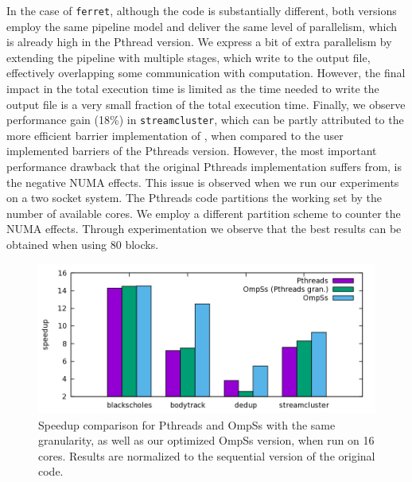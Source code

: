 In the case of \texttt{ferret}, although the code is substantially different, both versions employ the same pipeline model and deliver the same level of parallelism, which is already  high in the Pthread version.  
We express 
a bit of extra parallelism by extending the pipeline with multiple stages, which write to the output file, effectively overlapping some communication with computation. 
However, the final impact in the 
total execution time is limited as the time needed to write the output file is a very small fraction of the total execution time. 
Finally, we observe performance gain (18\%) in \texttt{streamcluster}, which can be partly attributed to the more efficient 
barrier implementation of \OMPSS{}, when compared to the user implemented barriers of the Pthreads version. 
However, the most important performance drawback 
that the original Pthreads implementation suffers from, is the negative NUMA effects.
This issue is observed when we run our experiments on a two socket system.
The Pthreads code partitions the working set by the number of available cores.
We employ a different partition scheme to counter the 
NUMA effects. Through experimentation we observe that the best results can be obtained when using 80 blocks. 


\begin{figure}[t]
  \centering
  \includegraphics[width=.9\textwidth]{ifcg/figures/parsec_comparison}
  \caption{Speedup comparison for Pthreads and OmpSs with the same granularity, as well as our optimized OmpSs version, when run on 16 cores. Results are normalized to the sequential version of the original code.}
  \label{fig:granularity_comparison}
	\vspace{0.5cm}
\end{figure}

